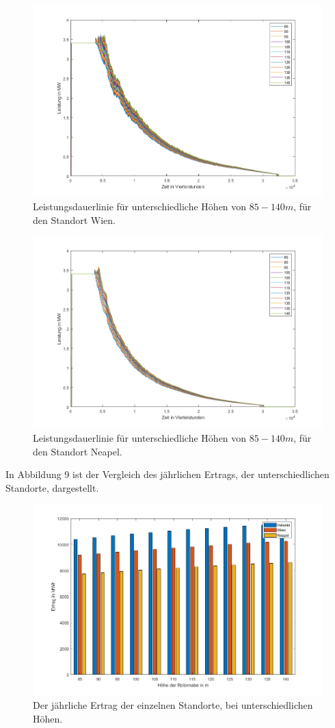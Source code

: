 \documentclass[a4paper,12pt]{article}
\begin{document}
	\begin{figure}[H]
		\centering
		\includegraphics[width=12cm]{img/results/LeistungsdauerlinieWien}
		\caption{Leistungsdauerlinie für unterschiedliche Höhen von $85 - 140m$, für den Standort Wien.}
	\end{figure}
	\begin{figure}[H]
		\centering
		\includegraphics[width=12cm]{img/results/LeistungsdauerlinieNeapel}
		\caption{Leistungsdauerlinie für unterschiedliche Höhen von $85 - 140m$, für den Standort Neapel.}
	\end{figure}
	\noindent In Abbildung 9 ist der Vergleich des jährlichen Ertrags, der unterschiedlichen Standorte, dargestellt.
	\begin{figure}[H]
		\centering
		\includegraphics[width=12cm]{img/results/ErtragEuropa}
		\caption{Der jährliche Ertrag der einzelnen Standorte, bei unterschiedlichen Höhen.}
	\end{figure}
\end{document}
